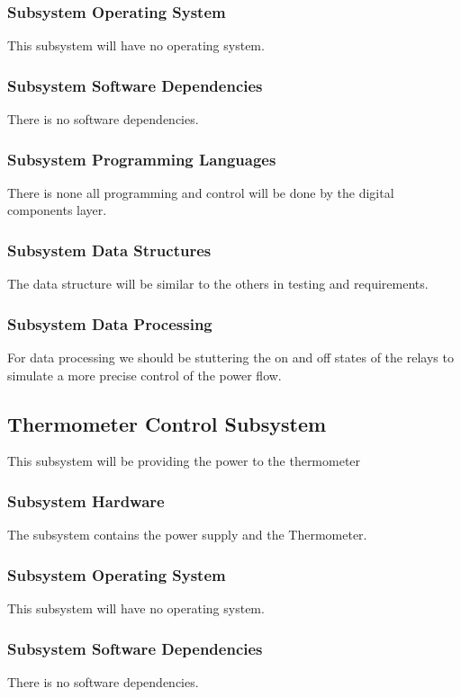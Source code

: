 \subsubsection{Subsystem Operating System}
This subsystem will have no operating system.

\subsubsection{Subsystem Software Dependencies}
There is no software dependencies.

\subsubsection{Subsystem Programming Languages}
There is none all programming and control will be done by the digital components layer.

\subsubsection{Subsystem Data Structures}
The data structure will be similar to the others in testing and requirements. 

\subsubsection{Subsystem Data Processing}
For data processing we should be stuttering the on and off states of the relays to simulate a more precise control of the power flow.





\subsection{Thermometer Control Subsystem}
This subsystem will be providing the power to the thermometer


\subsubsection{Subsystem Hardware}
The subsystem contains the power supply and the Thermometer.


\subsubsection{Subsystem Operating System}
This subsystem will have no operating system.

\subsubsection{Subsystem Software Dependencies}
There is no software dependencies.

